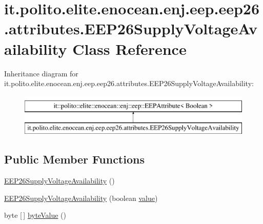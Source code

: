 \hypertarget{classit_1_1polito_1_1elite_1_1enocean_1_1enj_1_1eep_1_1eep26_1_1attributes_1_1_e_e_p26_supply_voltage_availability}{}\section{it.\+polito.\+elite.\+enocean.\+enj.\+eep.\+eep26.\+attributes.\+E\+E\+P26\+Supply\+Voltage\+Availability Class Reference}
\label{classit_1_1polito_1_1elite_1_1enocean_1_1enj_1_1eep_1_1eep26_1_1attributes_1_1_e_e_p26_supply_voltage_availability}
Inheritance diagram for it.\+polito.\+elite.\+enocean.\+enj.\+eep.\+eep26.\+attributes.\+E\+E\+P26\+Supply\+Voltage\+Availability\+:\begin{figure}[H]
\begin{center}
\leavevmode
\includegraphics[height=2.000000cm]{classit_1_1polito_1_1elite_1_1enocean_1_1enj_1_1eep_1_1eep26_1_1attributes_1_1_e_e_p26_supply_voltage_availability}
\end{center}
\end{figure}
\subsection*{Public Member Functions}
\begin{DoxyCompactItemize}
\item 
\hyperlink{classit_1_1polito_1_1elite_1_1enocean_1_1enj_1_1eep_1_1eep26_1_1attributes_1_1_e_e_p26_supply_voltage_availability_a319b54a8e9cc8a902ff7d9f7c8e2844f}{E\+E\+P26\+Supply\+Voltage\+Availability} ()
\item 
\hyperlink{classit_1_1polito_1_1elite_1_1enocean_1_1enj_1_1eep_1_1eep26_1_1attributes_1_1_e_e_p26_supply_voltage_availability_a68a21cbd0e908ae4e4cd344a8dd7298d}{E\+E\+P26\+Supply\+Voltage\+Availability} (boolean \hyperlink{classit_1_1polito_1_1elite_1_1enocean_1_1enj_1_1eep_1_1_e_e_p_attribute_af4d7e34642004bb6ccfae51e925c983d}{value})
\item 
byte \mbox{[}$\,$\mbox{]} \hyperlink{classit_1_1polito_1_1elite_1_1enocean_1_1enj_1_1eep_1_1eep26_1_1attributes_1_1_e_e_p26_supply_voltage_availability_a0b687ee28c98b69a7ad16eba04028da7}{byte\+Value} ()
\end{DoxyCompactItemize}
